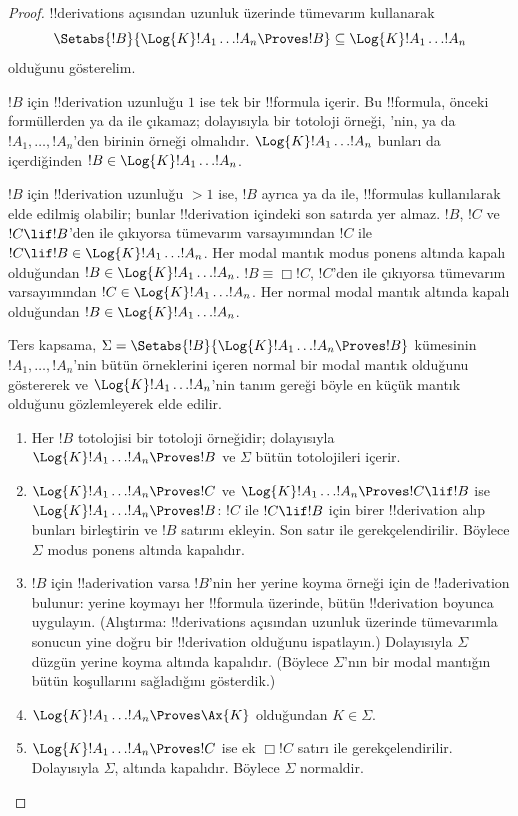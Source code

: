 \begin{proof}
  !!{derivation}s açısından uzunluk üzerinde tümevarım kullanarak
  \[
  \Setabs{!B}{\Log{K}!A_1\dots !A_n\Proves !B}
  \subseteq\Log{K}!A_1\dots !A_n
  \]
  olduğunu gösterelim.

  $!B$ için !!{derivation} uzunluğu $1$ ise tek bir !!{formula} içerir.
  Bu !!{formula}, önceki formüllerden \MP{} ya da \Nec{} ile çıkamaz;
  dolayısıyla bir totoloji örneği, 'nin,
   ya da $!A_1,\dots,!A_n$'den birinin
  örneği olmalıdır. $\Log{K}!A_1\dots !A_n$ bunları da içerdiğinden
  $!B\in\Log{K}!A_1\dots !A_n$.

  $!B$ için !!{derivation} uzunluğu $>1$ ise, $!B$ ayrıca \MP{} ya da
  \Nec{} ile, !!{formula}s kullanılarak elde edilmiş olabilir; bunlar
  !!{derivation} içindeki son satırda yer almaz. $!B$, $!C$ ve
  $!C\lif !B$'den \MP{} ile çıkıyorsa tümevarım varsayımından $!C$ ile
  $!C\lif !B\in\Log{K}!A_1\dots !A_n$.
  Her modal mantık modus ponens altında kapalı olduğundan
  $!B\in\Log{K}!A_1\dots !A_n$. $!B\equiv\Box !C$, $!C$'den \Nec{} ile
  çıkıyorsa tümevarım varsayımından $!C\in\Log{K}!A_1\dots !A_n$.
  Her normal modal mantık \Nec{} altında kapalı olduğundan
  $!B\in\Log{K}!A_1\dots !A_n$.

  Ters kapsama, $\Sigma=\Setabs{!B}{\Log{K}!A_1\dots !A_n\Proves !B}$
  kümesinin $!A_1,\dots,!A_n$'nin bütün örneklerini içeren normal bir modal
  mantık olduğunu göstererek ve $\Log{K}!A_1\dots !A_n$'nin tanım gereği
  böyle en küçük mantık olduğunu gözlemleyerek elde edilir.
  \begin{enumerate}
    \item Her $!B$ totolojisi bir totoloji örneğidir; dolayısıyla
      $\Log{K}!A_1\dots !A_n\Proves !B$ ve $\Sigma$ bütün totolojileri
      içerir.
    \item $\Log{K}!A_1\dots !A_n\Proves !C$ ve
      $\Log{K}!A_1\dots !A_n\Proves !C\lif !B$ ise
      $\Log{K}!A_1\dots !A_n\Proves !B$: $!C$ ile $!C\lif !B$ için birer
      !!{derivation} alıp bunları birleştirin ve $!B$ satırını ekleyin.
      Son satır \MP{} ile gerekçelendirilir. Böylece $\Sigma$ modus ponens
      altında kapalıdır.
    \item $!B$ için !!a{derivation} varsa $!B$'nin her yerine koyma
      örneği için de !!a{derivation} bulunur: yerine koymayı her !!{formula}
      üzerinde, bütün !!{derivation} boyunca uygulayın. (Alıştırma: !!{derivation}s açısından
      uzunluk üzerinde tümevarımla sonucun yine doğru bir !!{derivation}
      olduğunu ispatlayın.) Dolayısıyla $\Sigma$ düzgün yerine koyma altında
      kapalıdır. (Böylece $\Sigma$'nın bir modal mantığın bütün koşullarını
      sağladığını gösterdik.)
    \item $\Log{K}!A_1\dots !A_n\Proves\Ax{K}$ olduğundan $K\in\Sigma$.
    \item $\Log{K}!A_1\dots !A_n\Proves !C$ ise ek $\Box !C$ satırı
      \Nec{} ile gerekçelendirilir. Dolayısıyla $\Sigma$, \Nec{} altında
      kapalıdır. Böylece $\Sigma$ normaldir.
  \end{enumerate}
\end{proof}

